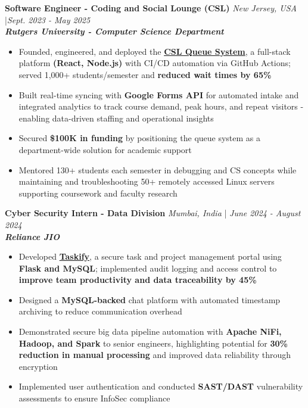 \documentclass[a4paper]{article}
\begin{document}
\textbf{Software Engineer - Coding and Social Lounge (CSL)} \hfill \textit{New Jersey, USA} |\textit{Sept. 2023 - May 2025} \\
\textit{\textbf{Rutgers University - Computer Science Department}}
\vspace{-2.5mm}
\begin{itemize} \itemsep -4pt 
    \item Founded, engineered, and deployed the \textbf{\href{https://drive.google.com/file/d/1x0PIBHbKDmxw2qpGwwiSsk5e5cq8U_7k/view?usp=sharing}{CSL Queue System}}, a full-stack platform \textbf{(React, Node.js)} with CI/CD automation via GitHub Actions; served 1,000+ students/semester and \textbf{reduced wait times by 65\%}
    \item Built real-time syncing with \textbf{Google Forms API} for automated intake and integrated analytics to track course demand, peak hours, and repeat visitors - enabling data-driven staffing and operational insights
    \item Secured \textbf{\$100K in funding} by positioning the queue system as a department-wide solution for academic support 
    \item Mentored 130+ students each semester in debugging and CS concepts while maintaining and troubleshooting 50+ remotely accessed Linux servers supporting coursework and faculty research
\end{itemize}
\vspace{-2mm}

\textbf{Cyber Security Intern - Data Division} \hfill  \textit{Mumbai, India} | \textit{June 2024 - August 2024} \\ 
\textit{\textbf{Reliance JIO}}
\vspace{-2.5mm}
\begin{itemize} \itemsep -4pt 
    \item Developed \textbf{\href{https://github.com/ShatakshiRanjan/JIOWebDesign}{Taskify}}, a secure task and project management portal using \textbf{Flask and MySQL}; implemented audit logging and access control to \textbf{improve team productivity and data traceability by 45\%}
    \item Designed a \textbf{MySQL-backed} chat platform with automated timestamp archiving to reduce communication overhead
    \item Demonstrated secure big data pipeline automation with \textbf{Apache NiFi, Hadoop, and Spark} to senior engineers, highlighting potential for \textbf{30\% reduction in manual processing} and improved data reliability through encryption
    \item Implemented user authentication and conducted \textbf{SAST/DAST} vulnerability assessments to ensure InfoSec compliance
\end{itemize}
\vspace{-2mm}
\end{document}
